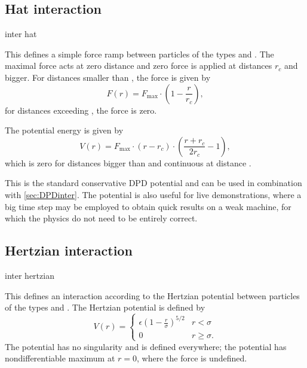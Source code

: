 \subsection{Hat interaction}

\begin{essyntax}
  inter  
  hat  
  \begin{features}
  \end{features}
\end{essyntax}
This defines a simple force ramp between particles of the types  and
 . The maximal force  acts at zero distance and 
zero force is applied at distances $r_c$ and bigger. For distances smaller than 
, the force is given by
\begin{equation}
  F(r)=F_{\text{max}} \cdot \left( 1 - \frac{r}{r_c} \right),
\end{equation}
for distances exceeding , the force is zero.

The potential energy is given by
\begin{equation}
  V(r)=F_{\text{max}} \cdot (r-r_c) \cdot \left( \frac{r+r_c}{2r_c} - 1 \right),
\end{equation}
which is zero for distances bigger than  and continuous at distance 
.

This is the standard conservative DPD potential and can be used in combination 
with  \ref{sec:DPDinter}. The potential is also useful for live 
demonstrations, where a big time step may be employed to obtain quick results
on a weak machine, for which the physics do not need to be entirely correct.  

\subsection{Hertzian interaction}

\begin{essyntax}
  inter  
  hertzian \var{\sigma} \var{\epsilon}
  \begin{features}
  \end{features}
\end{essyntax}
This defines an interaction according to the Hertzian potential
between particles of the types  and . The
Hertzian potential is defined by
\begin{equation}
  V(r)=
  \begin{cases} \epsilon\left(1-\frac{r}{\sigma}\right)^{5/2} & r < \sigma\\
    0 & r \ge \sigma.
  \end{cases}
\end{equation}
The potential has no singularity and is defined everywhere; the
potential has nondifferentiable maximum at $r=0$, where the force is
undefined.

